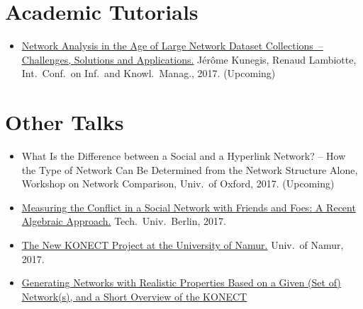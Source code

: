 \documentclass[line,mm]{res}
\newcounter{x}
\newcounter{y}
\newcommand{\talknumber}{T\arabic{y}\stepcounter{y}}
\begin{document}
\begin{resume}
\section{Academic Tutorials}
\begin{itemize}
  \item[{[\talknumber]}]
    \href{http://xn.unamur.be/network-collection-tutorial-cikm2017/}{Network Analysis in the Age of Large Network Dataset Collections~--
    Challenges, Solutions and Applications.}
    Jérôme Kunegis, Renaud Lambiotte, Int.\ Conf.\ on Inf.\ and Knowl.\ Manag., 2017.  (Upcoming)
\end{itemize}

\section{Other Talks}
\begin{itemize}
  \item[{[\talknumber]}]
    What Is the Difference between a Social and a Hyperlink Network?
    -- How the Type of Network Can Be Determined from the Network Structure
    Alone, Workshop on Network Comparison, 
    Univ.\ of Oxford, 2017.  (Upcoming)
  \item[{[\talknumber]}]
    \href{https://www.slideshare.net/kunegis/measuring-the-conflict-in-a-social-network-with-friends-and-foes-a-recent-algebraic-approach}{Measuring the Conflict in a Social Network with Friends and Foes:  A
    Recent Algebraic Approach.}
    Tech.\ Univ.\ Berlin, 2017. 
  \item[{[\talknumber]}] 
    \href{https://github.com/kunegis/pdfs/blob/master/kunegis:konect-namur.presentation.pdf}{The
      New KONECT Project at the University of Namur.}
    Univ.\ of Namur, 2017. 
  \item[{[\talknumber]}] 
    \href{https://github.com/kunegis/pdfs/blob/master/kunegis:graph-generator-namur.presentation.pdf}{Generating
      Networks with Realistic Properties Based on a 
    Given (Set of) Network(s), and a Short Overview of the KONECT
}
\end{itemize}
\end{resume}
\end{document}
